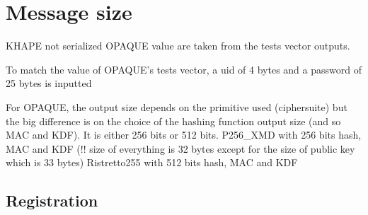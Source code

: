 \documentclass[../report.tex]{subfiles}
\begin{document}


\section{Message size}

KHAPE not serialized
OPAQUE value are taken from the tests vector outputs.

To match the value of OPAQUE's tests vector, a uid of 4 bytes and a password of 25 bytes is inputted


For OPAQUE, the output size depends on the primitive used (ciphersuite) but the big difference is on the choice of the hashing function output size (and so MAC and KDF). It is either 256 bits or 512 bits.
P256\_XMD with 256 bits hash, MAC and KDF (!! size of everything is 32 bytes except for the size of public key which is 33 bytes)
Ristretto255 with 512 bits hash, MAC and KDF


% 
% 



\pgfplotsset{width=\textwidth-2.4cm}


\subsection*{Registration}
\end{document}
